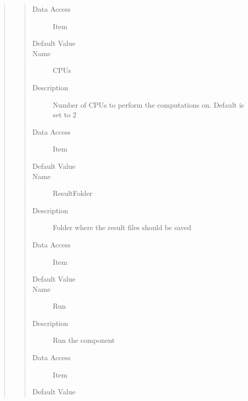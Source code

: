 \documentclass[letterpaper,10pt,english]{sphinxmanual}
\begin{document}
\begin{quote}
\begin{description}
\begin{quote}
\begin{description}
\item[{Data Access}] \leavevmode
Item

\item[{Default Value}] \leavevmode
{}

\item[{Name}] \leavevmode
CPUs

\item[{Description}] \leavevmode
Number of CPUs to perform the computations on. Default is set to 2

\item[{Data Access}] \leavevmode
Item

\item[{Default Value}] \leavevmode
{}

\item[{Name}] \leavevmode
ResultFolder

\item[{Description}] \leavevmode
Folder where the result files should be saved

\item[{Data Access}] \leavevmode
Item

\item[{Default Value}] \leavevmode
{}

\item[{Name}] \leavevmode
Run

\item[{Description}] \leavevmode
Run the component

\item[{Data Access}] \leavevmode
Item

\item[{Default Value}] \leavevmode
{}

\end{description}\end{quote}


\end{description}
\end{quote}
\end{document}
